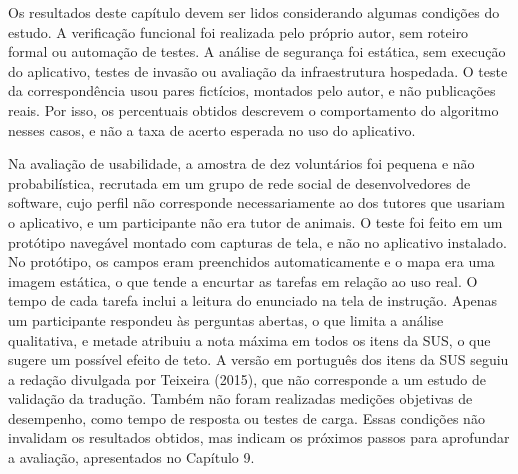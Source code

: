 Os resultados deste capítulo devem ser lidos considerando algumas condições do estudo. A verificação funcional foi realizada pelo próprio autor, sem roteiro formal ou automação de testes. A análise de segurança foi estática, sem execução do aplicativo, testes de invasão ou avaliação da infraestrutura hospedada. O teste da correspondência usou pares fictícios, montados pelo autor, e não publicações reais. Por isso, os percentuais obtidos descrevem o comportamento do algoritmo nesses casos, e não a taxa de acerto esperada no uso do aplicativo.

Na avaliação de usabilidade, a amostra de dez voluntários foi pequena e não probabilística, recrutada em um grupo de rede social de desenvolvedores de software, cujo perfil não corresponde necessariamente ao dos tutores que usariam o aplicativo, e um participante não era tutor de animais. O teste foi feito em um protótipo navegável montado com capturas de tela, e não no aplicativo instalado. No protótipo, os campos eram preenchidos automaticamente e o mapa era uma imagem estática, o que tende a encurtar as tarefas em relação ao uso real. O tempo de cada tarefa inclui a leitura do enunciado na tela de instrução. Apenas um participante respondeu às perguntas abertas, o que limita a análise qualitativa, e metade atribuiu a nota máxima em todos os itens da SUS, o que sugere um possível efeito de teto. A versão em português dos itens da SUS seguiu a redação divulgada por Teixeira (2015), que não corresponde a um estudo de validação da tradução. Também não foram realizadas medições objetivas de desempenho, como tempo de resposta ou testes de carga. Essas condições não invalidam os resultados obtidos, mas indicam os próximos passos para aprofundar a avaliação, apresentados no Capítulo 9.
